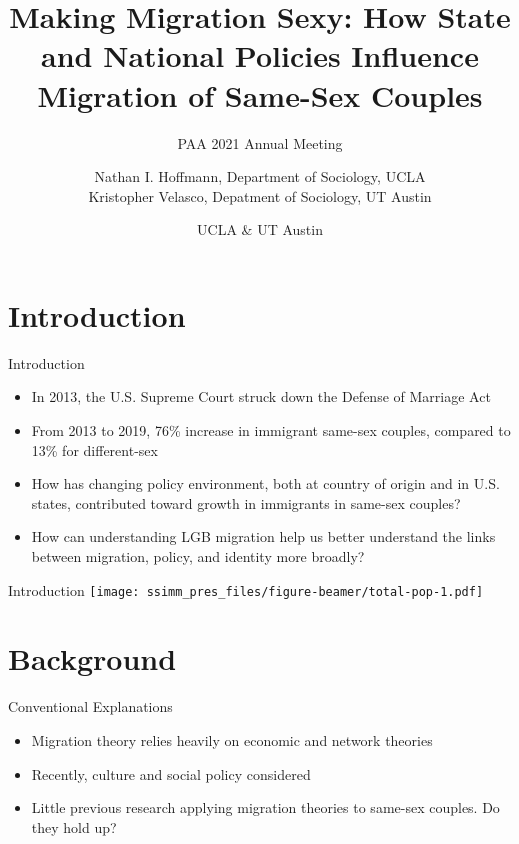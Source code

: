 \documentclass[
  ignorenonframetext,
]{beamer}
\title{Making Migration Sexy: How State and National Policies Influence
Migration of Same-Sex Couples}
\subtitle{PAA 2021 Annual Meeting}
\author{Nathan I. Hoffmann, Department of Sociology, UCLA\\
Kristopher Velasco, Depatment of Sociology, UT Austin}
\date{UCLA \& UT Austin}
\providecommand{\tightlist}{%
  \setlength{\itemsep}{0pt}\setlength{\parskip}{0pt}}
\begin{document}
\frame{\titlepage}

\hypertarget{introduction}{%
\section{Introduction}\label{introduction}}

\begin{frame}{Introduction}
\protect\hypertarget{introduction-1}{}
\begin{itemize}
\tightlist
\item
  In 2013, the U.S. Supreme Court struck down the Defense of Marriage
  Act
\item
  From 2013 to 2019, 76\% increase in immigrant same-sex couples,
  compared to 13\% for different-sex
\item
  How has changing policy environment, both at country of origin and in
  U.S. states, contributed toward growth in immigrants in same-sex
  couples?
\item
  How can understanding LGB migration help us better understand the
  links between migration, policy, and identity more broadly?
\end{itemize}
\end{frame}

\begin{frame}{Introduction}
\protect\hypertarget{introduction-2}{}
\texttt{[image: ssimm\_pres\_files/figure-beamer/total-pop-1.pdf]}
\end{frame}

\hypertarget{background}{%
\section{Background}\label{background}}

\begin{frame}{Conventional Explanations}
\protect\hypertarget{conventional-explanations}{}
\begin{itemize}
\tightlist
\item
  Migration theory relies heavily on economic and network theories
\item
  Recently, culture and social policy considered
\item
  Little previous research applying migration theories to same-sex
  couples. Do they hold up?
\end{itemize}
\end{frame}
\end{document}
